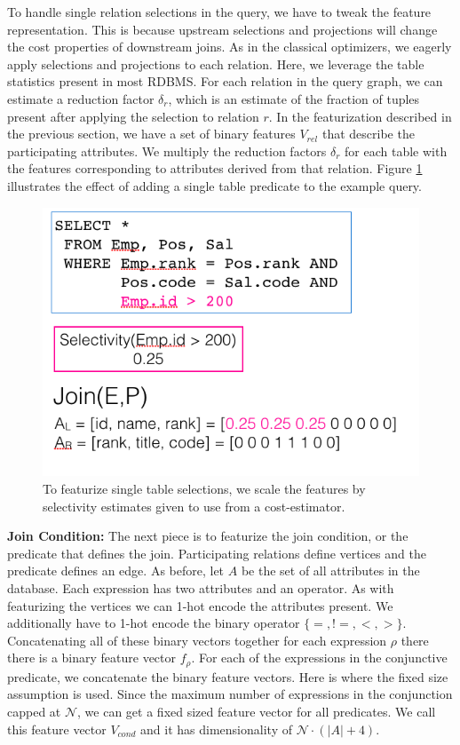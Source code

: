 To handle single relation selections in the query, we have to tweak the feature representation. This is because upstream selections and projections will change the cost properties of downstream joins. As in the classical optimizers, we eagerly apply selections and projections to each relation. 
Here, we leverage the table statistics present in most RDBMS. For each relation in the query graph, we can estimate a reduction factor $\delta_{r}$, which is an estimate of the fraction of tuples present after applying the selection to relation $r$. 
In the featurization described in the previous section, we have a set of binary features $V_{rel}$ that describe the participating attributes.
We multiply the reduction factors $\delta_r$ for each table with the features corresponding to attributes derived from that relation.
Figure \ref{feat:sel} illustrates the effect of adding a single table predicate to the example query. 

\begin{figure}
    \centering
    \includegraphics[width=\columnwidth]{figs/selectivity.png}
    \caption{To featurize single table selections, we scale the features by selectivity estimates given to use from a cost-estimator. \label{feat:sel}}
\end{figure}

\vspace{0.5em} \noindent \textbf{Join Condition: } The next piece is to featurize the join condition, or the predicate that defines the join. Participating relations define vertices and the predicate defines an edge. As before, let $A$ be the set of all attributes in the database. Each expression has two attributes and an operator. As with featurizing the vertices we can 1-hot encode the attributes present. We additionally have to 1-hot encode the binary operator $\{=,!=,<,>\}$. Concatenating all of these binary vectors together for each expression $\rho$ there there is a binary feature vector $f_\rho$.  For each of the expressions in the conjunctive predicate, we concatenate the binary feature vectors. Here is where the fixed size assumption is used. Since the maximum number of expressions in the conjunction capped at $\mathcal{N}$, we can get a fixed sized feature vector for all predicates. We call this feature vector $V_{cond}$ and it has dimensionality of $\mathcal{N} \cdot(|A|+4)$. 

